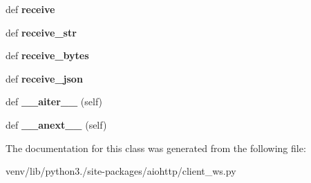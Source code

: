 \begin{DoxyCompactItemize}
def {\bfseries receive}
\item 
\mbox{\label{classaiohttp_1_1client__ws_1_1_client_web_socket_response_adefa58f322eef5043e637be9610a8417}} 
def {\bfseries receive\+\_\+str}
\item 
\mbox{\label{classaiohttp_1_1client__ws_1_1_client_web_socket_response_a09fa9a4274ade6308d389a8afa7eac59}} 
def {\bfseries receive\+\_\+bytes}
\item 
\mbox{\label{classaiohttp_1_1client__ws_1_1_client_web_socket_response_a24c8366a65cb5dca188b35e0ef83a61a}} 
def {\bfseries receive\+\_\+json}
\item 
\mbox{\label{classaiohttp_1_1client__ws_1_1_client_web_socket_response_a3fe4ec30578f01681bed5a26fbf1bee6}} 
def {\bfseries \+\_\+\+\_\+aiter\+\_\+\+\_\+} (self)
\item 
\mbox{\label{classaiohttp_1_1client__ws_1_1_client_web_socket_response_ac49ea4dc29a116d1a6b0dc519d30c279}} 
def {\bfseries \+\_\+\+\_\+anext\+\_\+\+\_\+} (self)
\end{DoxyCompactItemize}


The documentation for this class was generated from the following file\+:\begin{DoxyCompactItemize}
\item 
venv/lib/python3./site-\/packages/aiohttp/client\+\_\+ws.\+py\end{DoxyCompactItemize}
